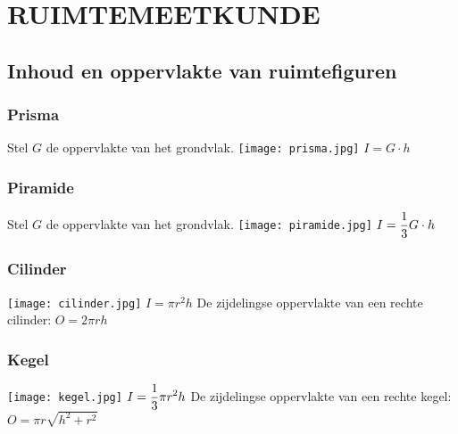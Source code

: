 \section{RUIMTEMEETKUNDE} \label{ruimtemeetkunde}
\hypertarget{ruimtemeetkunde}{}

\subsection{Inhoud en oppervlakte van ruimtefiguren} \label{inhoud_ruimtefiguren}
\hypertarget{inhoud_ruimtefiguren}{}

\subsubsection{Prisma} \label{prisma}
\hypertarget{prisma}{}
Stel $G$ de oppervlakte van het grondvlak.\newline
\texttt{[image: prisma.jpg]}
$I=G\cdot h$

\subsubsection{Piramide} \label{piramide}
\hypertarget{piramide}{}
Stel $G$ de oppervlakte van het grondvlak.\newline
\texttt{[image: piramide.jpg]}
$I=\displaystyle\frac{\displaystyle 1}{\displaystyle 3}G\cdot h$

\subsubsection{Cilinder} \label{cilinder}
\hypertarget{cilinder}{}
\texttt{[image: cilinder.jpg]}
$I=\pi r^2 h$\newline
De zijdelingse oppervlakte van een rechte cilinder: $O = 2\pi r h $

\subsubsection{Kegel} \label{kegel}
\hypertarget{kegel}{}
\texttt{[image: kegel.jpg]}
$I=\displaystyle\frac{\displaystyle 1}{\displaystyle 3}\pi r^2 h$\newline
De zijdelingse oppervlakte van een rechte kegel: $O = \pi r \sqrt{h^2+r^2}$

